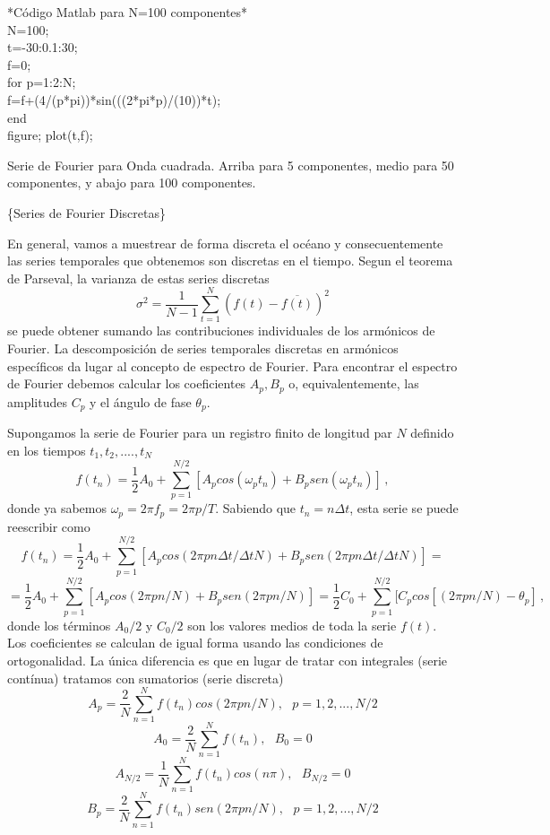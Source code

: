 \documentclass[
]{agujournal2019}
\begin{document}
\vspace{0.75cm}
\begin{framed}
\noindent **Código Matlab para N=100 componentes*
\\
{\noindent} N=100;\\
t=-30:0.1:30;\\
f=0;\\
for p=1:2:N;\\
f=f+(4/(p*pi))*sin(((2*pi*p)/(10))*t);\\
end\\
figure; plot(t,f);\\
\end{framed}

\begin{center}
\end{center}

\begin{center}
Serie de Fourier para Onda cuadrada. Arriba para 5 componentes, medio para 
50 componentes, y abajo para 100 componentes.
\end{center}

\vspace{0.25cm}

\{\textbf \large Series de Fourier Discretas\}

En general, vamos a muestrear de forma discreta el océano y
consecuentemente las series temporales que obtenemos son discretas en el
tiempo. Segun el teorema de Parseval, la varianza de estas series
discretas
\[\sigma^2=\frac{1}{N-1}\sum\limits^N_{t=1}(f(t)-\overline{f(t)})^2\] se
puede obtener sumando las contribuciones individuales de los armónicos
de Fourier. La descomposición de series temporales discretas en
armónicos específicos da lugar al concepto de espectro de Fourier. Para
encontrar el espectro de Fourier debemos calcular los coeficientes
\(A_p,B_p\) o, equivalentemente, las amplitudes \(C_p\) y el ángulo de
fase \(\theta_p\).

Supongamos la serie de Fourier para un registro finito de longitud par
\(N\) definido en los tiempos \(t_1, t_2,....,t_N\)
\[f(t_n)=\frac{1}{2}A_0+\sum\limits^{N/2}_{p=1}[A_p cos(\omega_p t_n) + B_p sen(\omega_p t_n)]\,,\]
donde ya sabemos \(\omega_p=2\pi f_p=2\pi p/T\). Sabiendo que
\(t_n=n \Delta t\), esta serie se puede reescribir como
\[f(t_n)=\frac{1}{2}A_0+\sum\limits^{N/2}_{p=1}[A_p cos(2\pi p n \Delta t / \Delta t N) + B_p sen(2\pi p n \Delta t / \Delta t N)]=\]
\[=\frac{1}{2}A_0+\sum\limits^{N/2}_{p=1}[A_p cos(2\pi p n  / N) + B_p sen(2\pi p n / N)]=
\frac{1}{2}C_0 + \sum\limits^{N/2}_{p=1}[C_p cos[(2\pi p n  / N) - \theta_p]\,,\]
donde los términos \(A_0/2\) y \(C_0/2\) son los valores medios de toda
la serie \(f(t)\). Los coeficientes se calculan de igual forma usando
las condiciones de ortogonalidad. La única diferencia es que en lugar de
tratar con integrales (serie contínua) tratamos con sumatorios (serie
discreta)
\[A_p=\frac{2}{N}\sum\limits_{n=1}^{N} f(t_n) cos(2\pi p n /N),\,\,\,\,p=1,2,...,N/2\]
\[A_0=\frac{2}{N}\sum\limits_{n=1}^{N} f(t_n),\,\,\,\,B_0=0\]
\[A_{N/2}=\frac{1}{N}\sum\limits_{n=1}^{N} f(t_n)cos(n\pi),\,\,\,\,B_{N/2}=0\]
\[B_p=\frac{2}{N}\sum\limits_{n=1}^{N} f(t_n) sen(2\pi p n /N),\,\,\,\,p=1,2,...,N/2\]
\end{document}
